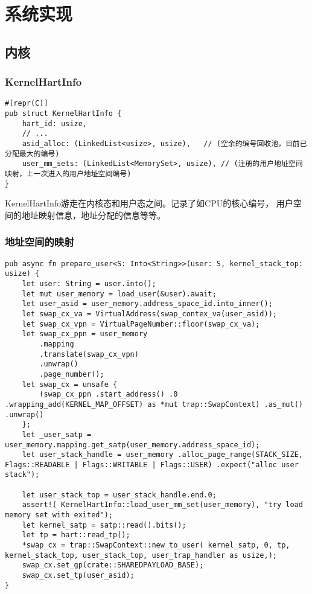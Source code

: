 \chapter{系统实现}
\label{chap:SystemImplement}

\section{内核}

\subsection{KernelHartInfo}
\begin{lstlisting}[caption=KernelHartInfo的结构]
#[repr(C)]
pub struct KernelHartInfo {
    hart_id: usize,
    // ...
    asid_alloc: (LinkedList<usize>, usize),   // (空余的编号回收池，目前已分配最大的编号)
    user_mm_sets: (LinkedList<MemorySet>, usize), // (注册的用户地址空间映射，上一次进入的用户地址空间编号)
}
\end{lstlisting}

KernelHartInfo游走在内核态和用户态之间。记录了如CPU的核心编号， 用户空间的地址映射信息，地址分配的信息等等。

\subsection{地址空间的映射}

\begin{lstlisting}[caption=用户态对地址空间的映射]
pub async fn prepare_user<S: Into<String>>(user: S, kernel_stack_top: usize) {
    let user: String = user.into();
    let mut user_memory = load_user(&user).await;
    let user_asid = user_memory.address_space_id.into_inner();
    let swap_cx_va = VirtualAddress(swap_contex_va(user_asid));
    let swap_cx_vpn = VirtualPageNumber::floor(swap_cx_va);
    let swap_cx_ppn = user_memory
        .mapping
        .translate(swap_cx_vpn)
        .unwrap()
        .page_number();
    let swap_cx = unsafe {
        (swap_cx_ppn .start_address() .0 .wrapping_add(KERNEL_MAP_OFFSET) as *mut trap::SwapContext) .as_mut() .unwrap()
    };
    let _user_satp = user_memory.mapping.get_satp(user_memory.address_space_id);
    let user_stack_handle = user_memory .alloc_page_range(STACK_SIZE, Flags::READABLE | Flags::WRITABLE | Flags::USER) .expect("alloc user stack");

    let user_stack_top = user_stack_handle.end.0;
    assert!( KernelHartInfo::load_user_mm_set(user_memory), "try load memory set with exited");
    let kernel_satp = satp::read().bits();
    let tp = hart::read_tp();
    *swap_cx = trap::SwapContext::new_to_user( kernel_satp, 0, tp, kernel_stack_top, user_stack_top, user_trap_handler as usize,);
    swap_cx.set_gp(crate::SHAREDPAYLOAD_BASE);
    swap_cx.set_tp(user_asid);
}
\end{lstlisting}


